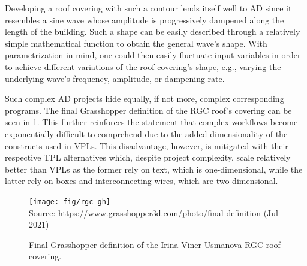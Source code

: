 Developing a roof covering with such a contour lends itself well to \ac{AD}
since it resembles a sine wave whose amplitude is progressively dampened along
the length of the building.  Such a shape can be easily described through a
relatively simple mathematical function to obtain the general wave's shape.
With parametrization in mind, one could then easily fluctuate input variables in
order to achieve different variations of the roof covering's shape, e.g.,
varying the underlying wave's frequency, amplitude, or dampening rate.

Such complex \ac{AD} projects hide equally, if not more, complex corresponding
programs.  The final Grasshopper definition of the \ac{RGC} roof's covering can
be seen in \cref{fig:related.ad.vpl-scalability.rgc-gh}.  This further
reinforces the statement that complex workflows become exponentially difficult
to comprehend due to the added dimensionality of the constructs used in
\acp{VPL}.  This disadvantage, however, is mitigated with their respective
\ac{TPL} alternatives which, despite project complexity, scale relatively better
than \acp{VPL} as the former rely on text, which is one-dimensional, while the
latter rely on boxes and interconnecting wires, which are two-dimensional.

\begin{figure}[htbp]
  \texttt{[image: fig/rgc-gh]}\\
  {\scriptsize
  Source: \url{https://www.grasshopper3d.com/photo/final-definition} (Jul 2021)
  }
  \caption[Grasshopper definition of the \acl{RGC} roof covering]{
    Final Grasshopper definition of the Irina Viner-Usmanova \ac{RGC} roof
    covering.
  }
  \label{fig:related.ad.vpl-scalability.rgc-gh}
\end{figure}

